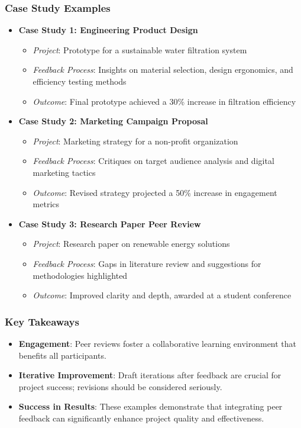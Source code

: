 \documentclass[aspectratio=169]{beamer}
\begin{document}
\begin{frame}[fragile]
    \frametitle{Case Study Examples}
    \begin{itemize}
        \item \textbf{Case Study 1: Engineering Product Design}
            \begin{itemize}
                \item \textit{Project}: Prototype for a sustainable water filtration system
                \item \textit{Feedback Process}: Insights on material selection, design ergonomics, and efficiency testing methods
                \item \textit{Outcome}: Final prototype achieved a 30\% increase in filtration efficiency
            \end{itemize}

        \item \textbf{Case Study 2: Marketing Campaign Proposal}
            \begin{itemize}
                \item \textit{Project}: Marketing strategy for a non-profit organization
                \item \textit{Feedback Process}: Critiques on target audience analysis and digital marketing tactics
                \item \textit{Outcome}: Revised strategy projected a 50\% increase in engagement metrics
            \end{itemize}

        \item \textbf{Case Study 3: Research Paper Peer Review}
            \begin{itemize}
                \item \textit{Project}: Research paper on renewable energy solutions
                \item \textit{Feedback Process}: Gaps in literature review and suggestions for methodologies highlighted
                \item \textit{Outcome}: Improved clarity and depth, awarded at a student conference
            \end{itemize}    
    \end{itemize}
\end{frame}

\begin{frame}[fragile]
    \frametitle{Key Takeaways}
    \begin{itemize}
        \item \textbf{Engagement}: Peer reviews foster a collaborative learning environment that benefits all participants.
        \item \textbf{Iterative Improvement}: Draft iterations after feedback are crucial for project success; revisions should be considered seriously.
        \item \textbf{Success in Results}: These examples demonstrate that integrating peer feedback can significantly enhance project quality and effectiveness.
    \end{itemize}
\end{frame}
\end{document}
